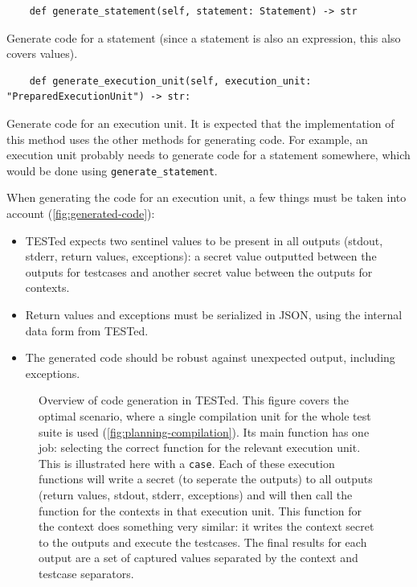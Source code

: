 \documentclass[../main]{subfiles}
\begin{document}
\begin{verbatim}
    def generate_statement(self, statement: Statement) -> str
\end{verbatim}

Generate code for a statement (since a statement is also an expression, this also covers values).

\begin{verbatim}
    def generate_execution_unit(self, execution_unit: "PreparedExecutionUnit") -> str:
\end{verbatim}

Generate code for an execution unit.
It is expected that the implementation of this method uses the other methods for generating code.
For example, an execution unit probably needs to generate code for a statement somewhere, which would be done using \texttt{generate_statement}.

When generating the code for an execution unit, a few things must be taken into account (\vref{fig:generated-code}):

\begin{itemize}
    \item TESTed expects two sentinel values to be present in all outputs (stdout, stderr, return values, exceptions): a secret value outputted between the outputs for testcases and another secret value between the outputs for contexts.
    \item Return values and exceptions must be serialized in JSON, using the internal data form from TESTed.
    \item The generated code should be robust against unexpected output, including exceptions.
\end{itemize}

\begin{figure}
    \centering
    
    \caption{Overview of code generation in TESTed.
        This figure covers the optimal scenario, where a single compilation unit for the whole test suite is used (\vref{fig:planning-compilation}).
        Its main function has one job: selecting the correct function for the relevant execution unit.
        This is illustrated here with a \texttt{case}.
        Each of these execution functions will write a secret (to seperate the outputs) to all outputs (return values, stdout, stderr, exceptions) and will then call the function for the contexts in that execution unit.
        This function for the context does something very similar: it writes the context secret to the outputs and execute the testcases.
        The final results for each output are a set of captured values separated by the context and testcase separators.
    }
    \label{fig:generated-code}
\end{figure}
\end{document}

